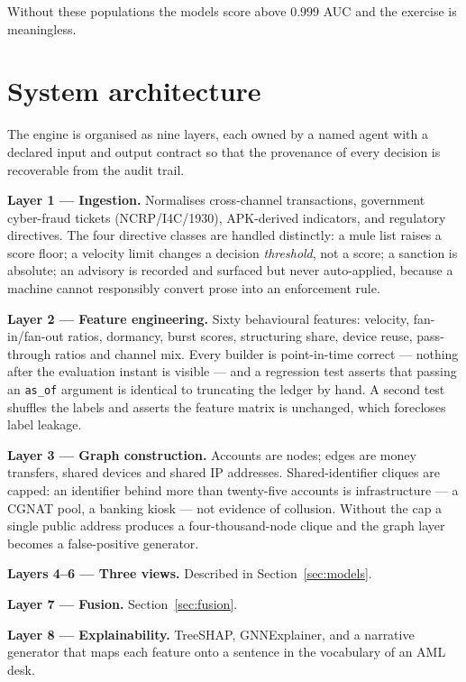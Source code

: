 \documentclass{article}
\begin{document}
Without these populations the models score above $0.999$ AUC and the exercise is
meaningless.

\section{System architecture}
\label{sec:arch}

The engine is organised as nine layers, each owned by a named agent with a
declared input and output contract so that the provenance of every decision is
recoverable from the audit trail.

\noindent\textbf{Layer 1 --- Ingestion.} Normalises cross-channel transactions,
government cyber-fraud tickets (NCRP/I4C/1930), APK-derived indicators, and
regulatory directives. The four directive classes are handled distinctly: a mule
list raises a score floor; a velocity limit changes a decision \emph{threshold},
not a score; a sanction is absolute; an advisory is recorded and surfaced but
never auto-applied, because a machine cannot responsibly convert prose into an
enforcement rule.

\noindent\textbf{Layer 2 --- Feature engineering.} Sixty behavioural features:
velocity, fan-in/fan-out ratios, dormancy, burst scores, structuring share,
device reuse, pass-through ratios and channel mix. Every builder is
point-in-time correct --- nothing after the evaluation instant is visible --- and
a regression test asserts that passing an \texttt{as\_of} argument is identical
to truncating the ledger by hand. A second test shuffles the labels and asserts
the feature matrix is unchanged, which forecloses label leakage.

\noindent\textbf{Layer 3 --- Graph construction.} Accounts are nodes; edges are
money transfers, shared devices and shared IP addresses. Shared-identifier
cliques are capped: an identifier behind more than twenty-five accounts is
infrastructure --- a CGNAT pool, a banking kiosk --- not evidence of collusion.
Without the cap a single public address produces a four-thousand-node clique and
the graph layer becomes a false-positive generator.

\noindent\textbf{Layers 4--6 --- Three views.} Described in
Section~\ref{sec:models}.

\noindent\textbf{Layer 7 --- Fusion.} Section~\ref{sec:fusion}.

\noindent\textbf{Layer 8 --- Explainability.} TreeSHAP, GNNExplainer, and a
narrative generator that maps each feature onto a sentence in the vocabulary of
an AML desk.
\end{document}
